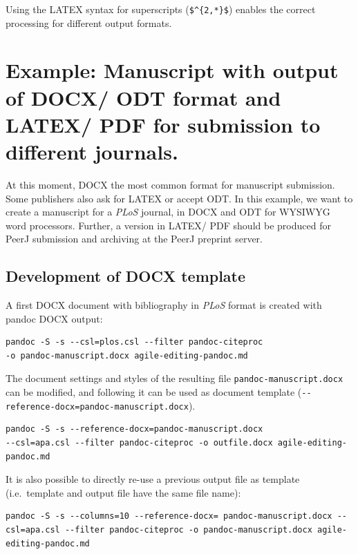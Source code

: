 \documentclass[10pt,fleqn]{wlpeerj}
\begin{document}
Using
the
LATEX
syntax
for
superscripts
(\texttt{\$\^{}\{2,*\}\$})
enables
the
correct
processing
for
different
output
formats.

\section{Example:
Manuscript
with
output
of
DOCX/
ODT
format
and
LATEX/
PDF
for
submission
to
different
journals.}\label{example-manuscript-with-output-of-docx-odt-format-and-latex-pdf-for-submission-to-different-journals.}

At
this
moment,
DOCX
the
most
common
format
for
manuscript
submission.
Some
publishers
also
ask
for
LATEX
or
accept
ODT.
In
this
example,
we
want
to
create
a
manuscript
for a
\emph{PLoS}
journal,
in
DOCX
and
ODT
for
WYSIWYG
word
processors.
Further,
a
version
in
LATEX/
PDF
should
be
produced
for
PeerJ
submission
and
archiving
at
the
PeerJ
preprint
server.

\subsection{Development
of
DOCX
template}\label{development-of-docx-template}

A
first
DOCX
document
with
bibliography
in
\emph{PLoS}
format
is
created
with
pandoc
DOCX
output:

\begin{verbatim}
pandoc -S -s --csl=plos.csl --filter pandoc-citeproc
-o pandoc-manuscript.docx agile-editing-pandoc.md
\end{verbatim}

The
document
settings
and
styles
of
the
resulting
file
\texttt{pandoc-manuscript.docx}
can
be
modified,
and
following
it
can
be
used
as
document
template
(\texttt{-\/-reference-docx=pandoc-manuscript.docx}).

\begin{verbatim}
pandoc -S -s --reference-docx=pandoc-manuscript.docx
--csl=apa.csl --filter pandoc-citeproc -o outfile.docx agile-editing-pandoc.md
\end{verbatim}

It is
also
possible
to
directly
re-use
a
previous
output
file
as
template
(i.e.~template
and
output
file
have
the
same
file
name):

\begin{verbatim}
pandoc -S -s --columns=10 --reference-docx= pandoc-manuscript.docx --csl=apa.csl --filter pandoc-citeproc -o pandoc-manuscript.docx agile-editing-pandoc.md
\end{verbatim}
\end{document}
